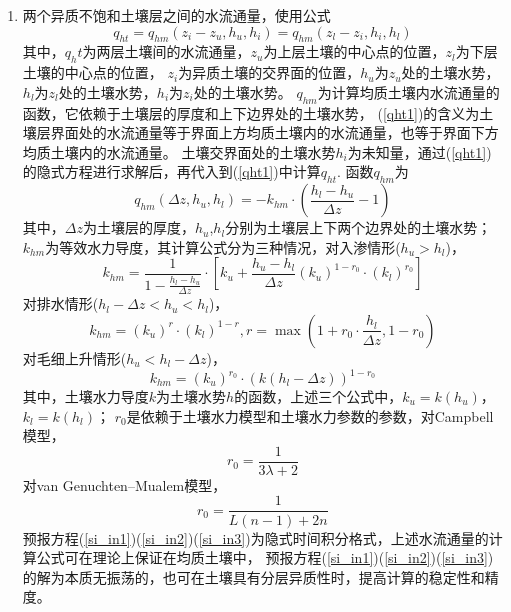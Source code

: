 \begin{enumerate}
    \item 两个异质不饱和土壤层之间的水流通量，使用公式
    \begin{equation}\label{qht1}
        q_{h t}=q_{h m}\left(z_{i}-z_{u}, h_{u}, h_{i}\right)=q_{h m}\left(z_{l}-z_{i}, h_{i}, h_{l}\right)
        \end{equation}
        其中，$q_ht$为两层土壤间的水流通量，$z_u$为上层土壤的中心点的位置，$z_l$为下层土壤的中心点的位置，
        $z_i$为异质土壤的交界面的位置，$h_u$为$z_u$处的土壤水势，$h_l$为$z_l$处的土壤水势，$h_i$为$z_i$处的土壤水势。
        $q_{hm}$为计算均质土壤内水流通量的函数，它依赖于土壤层的厚度和上下边界处的土壤水势，
        (\ref{qht1})的含义为土壤层界面处的水流通量等于界面上方均质土壤内的水流通量，也等于界面下方均质土壤内的水流通量。
        土壤交界面处的土壤水势$h_i$为未知量，通过(\ref{qht1})的隐式方程进行求解后，再代入到(\ref{qht1})中计算$q_{ht}$. 函数$q_{hm}$为
        \begin{equation}
        q_{h m}\left(\Delta z, h_{u}, h_{l}\right)=-k_{h m} \cdot\left(\frac{h_{l}-h_{u}}{\Delta z}-1\right)
        \end{equation}
        其中，$\Delta z$为土壤层的厚度，$h_u$,$h_l$分别为土壤层上下两个边界处的土壤水势；
        $k_{hm}$为等效水力导度，其计算公式分为三种情况，对入渗情形($h_u>h_l$)，
        \begin{equation}
        k_{h m}=\frac{1}{1-\frac{h_{l}-h_{u}}{\Delta z}} \cdot\left[k_{u}+\frac{h_{u}-h_{l}}{\Delta z}\left(k_{u}\right)^{1-r_{0}} \cdot\left(k_{l}\right)^{r_{0}}\right]
        \end{equation}
        对排水情形($h_l-\Delta z<h_u<h_l$)，
        \begin{equation}
        k_{h m}=\left(k_{u}\right)^{r} \cdot\left(k_{l}\right)^{1-r}, r=\max \left(1+r_{0} \cdot \frac{h_{l}}{\Delta z}, 1-r_{0}\right)
        \end{equation}
        对毛细上升情形($h_u<h_l-\Delta z$)，
        \begin{equation}
        k_{h m}=\left(k_{u}\right)^{r_{0}} \cdot\left(k\left(h_{l}-\Delta z\right)\right)^{1-r_{0}}
        \end{equation}
        其中，土壤水力导度$k$为土壤水势$h$的函数，上述三个公式中，$k_u=k(h_u )$，$k_l=k(h_l )$；
        $r_0$是依赖于土壤水力模型和土壤水力参数的参数，对Campbell模型，
        \begin{equation}
        r_{0}=\frac{1}{3 \lambda+2}
        \end{equation}
        对van Genuchten--Mualem模型，
        \begin{equation}
        r_{0}=\frac{1}{L(n-1)+2 n}
        \end{equation}
        预报方程(\ref{si_in1})(\ref{si_in2})(\ref{si_in3})为隐式时间积分格式，上述水流通量的计算公式可在理论上保证在均质土壤中，
        预报方程(\ref{si_in1})(\ref{si_in2})(\ref{si_in3})的解为本质无振荡的，也可在土壤具有分层异质性时，提高计算的稳定性和精度。


\end{enumerate}
